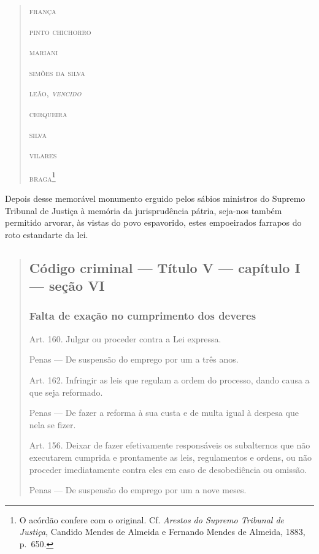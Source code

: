 \begin{quote}
\begin{flushright}
\textsc{frança}

\textsc{pinto chichorro}

\textsc{mariani}

\textsc{simões da silva}

\textsc{leão, \emph{vencido}}

\textsc{cerqueira}

\textsc{silva}

\textsc{vilares}

\textsc{braga}\footnote{O acórdão confere com o original. Cf. \emph{Arestos
    do Supremo Tribunal de Justiça}, Candido Mendes de Almeida e
    Fernando Mendes de Almeida, 1883, p.~650.}
\end{flushright}
\end{quote}

Depois desse memorável monumento erguido pelos sábios ministros do
Supremo Tribunal de Justiça à memória da jurisprudência pátria, seja-nos
também permitido arvorar, às vistas do povo espavorido, estes
empoeirados farrapos do roto estandarte da lei.

\begin{quote}
\subsection{Código criminal --- Título V --- capítulo I --- seção VI}

\subsubsection{Falta de exação\protect\footnotemark{} no cumprimento dos deveres}

\forceindent{}Art. 160. Julgar ou proceder contra a Lei expressa.

Penas --- De suspensão do emprego por um a três anos.

Art. 162. Infringir as leis que regulam a ordem do processo, dando causa
a que seja reformado.

Penas --- De fazer a reforma à sua custa e de multa igual à despesa que
nela se fizer.

Art. 156. Deixar de fazer efetivamente responsáveis os subalternos que
não executarem cumprida e prontamente as leis, regulamentos e ordens, ou
não proceder imediatamente contra eles em caso de desobediência ou
omissão.

Penas --- De suspensão do emprego por um a nove meses.
\end{quote}

